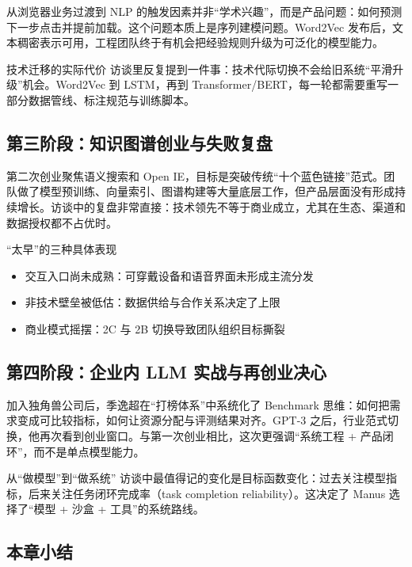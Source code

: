 \documentclass[a4paper]{article}
\begin{document}
从浏览器业务过渡到 NLP 的触发因素并非“学术兴趣”，而是产品问题：如何预测下一步点击并提前加载。这个问题本质上是序列建模问题。Word2Vec 发布后，文本稠密表示可用，工程团队终于有机会把经验规则升级为可泛化的模型能力。

\begin{knowledgebox}{技术迁移的实际代价}
访谈里反复提到一件事：技术代际切换不会给旧系统“平滑升级”机会。Word2Vec 到 LSTM，再到 Transformer/BERT，每一轮都需要重写一部分数据管线、标注规范与训练脚本。
\end{knowledgebox}

\subsection{第三阶段：知识图谱创业与失败复盘}

第二次创业聚焦语义搜索和 Open IE，目标是突破传统“十个蓝色链接”范式。团队做了模型预训练、向量索引、图谱构建等大量底层工作，但产品层面没有形成持续增长。访谈中的复盘非常直接：技术领先不等于商业成立，尤其在生态、渠道和数据授权都不占优时。

\begin{warningbox}{“太早”的三种具体表现}
\begin{itemize}
    \item 交互入口尚未成熟：可穿戴设备和语音界面未形成主流分发
    \item 非技术壁垒被低估：数据供给与合作关系决定了上限
    \item 商业模式摇摆：2C 与 2B 切换导致团队组织目标撕裂
\end{itemize}
\end{warningbox}

\subsection{第四阶段：企业内 LLM 实战与再创业决心}

加入独角兽公司后，季逸超在“打榜体系”中系统化了 Benchmark 思维：如何把需求变成可比较指标，如何让资源分配与评测结果对齐。GPT-3 之后，行业范式切换，他再次看到创业窗口。与第一次创业相比，这次更强调“系统工程 + 产品闭环”，而不是单点模型能力。

\begin{importantbox}{从“做模型”到“做系统”}
访谈中最值得记的变化是目标函数变化：过去关注模型指标，后来关注任务闭环完成率（task completion reliability）。这决定了 Manus 选择了“模型 + 沙盒 + 工具”的系统路线。
\end{importantbox}

\subsection{本章小结}
\end{document}
